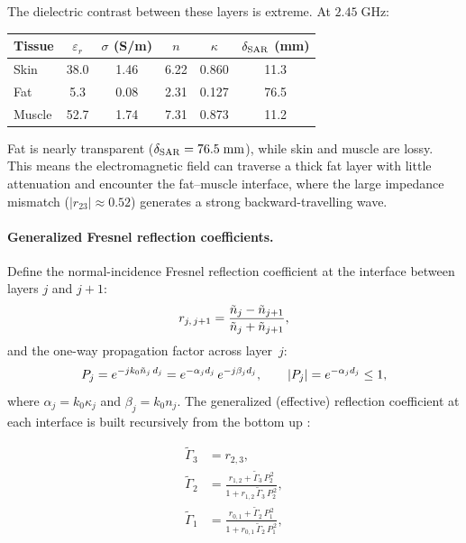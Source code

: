 \noindent
The dielectric contrast between these layers is extreme.  At
$2.45\;\mathrm{GHz}$:

\begin{center}
\begin{tabular}{@{}l c c c c c@{}}
\toprule
Tissue & $\varepsilon_r$ & $\sigma$ (S/m) & $n$ & $\kappa$ &
  $\delta_{\mathrm{SAR}}$ (mm) \\
\midrule
Skin   & 38.0 & 1.46 & 6.22 & 0.860 & 11.3 \\
Fat    &  5.3 & 0.08 & 2.31 & 0.127 & 76.5 \\
Muscle & 52.7 & 1.74 & 7.31 & 0.873 & 11.2 \\
\bottomrule
\end{tabular}
\end{center}

\noindent
Fat is nearly transparent ($\delta_{\mathrm{SAR}} = 76.5\;\mathrm{mm}$), while
skin and muscle are lossy.  This means the electromagnetic field can
traverse a thick fat layer with little attenuation and encounter the
fat--muscle interface, where the large impedance mismatch ($|r_{23}|
\approx 0.52$) generates a strong backward-travelling wave.

\paragraph{Generalized Fresnel reflection coefficients.}
Define the normal-incidence Fresnel reflection coefficient at the
interface between layers $j$ and $j+1$:
\begin{equation}\label{eq:rjj1}
  r_{j,\,j+1}
  = \frac{\tilde{n}_j - \tilde{n}_{j+1}}{\tilde{n}_j + \tilde{n}_{j+1}},
\end{equation}
and the one-way propagation factor across layer~$j$:
\begin{equation}\label{eq:Pj}
  P_j = e^{-jk_0\tilde{n}_j\,d_j}
  = e^{-\alpha_j d_j}\,e^{-j\beta_j d_j},
  \qquad
  |P_j| = e^{-\alpha_j d_j} \leq 1,
\end{equation}
where $\alpha_j = k_0\kappa_j$ and $\beta_j = k_0 n_j$.
The generalized (effective) reflection coefficient at each interface is
built recursively from the bottom up \cite{Chew1995}:

\begin{align}
  \widetilde{\Gamma}_3
    &= r_{2,3},
    \label{eq:Gamma3} \\[4pt]
  \widetilde{\Gamma}_2
    &= \frac{r_{1,2} + \widetilde{\Gamma}_3\,P_2^{\,2}}
            {1 + r_{1,2}\,\widetilde{\Gamma}_3\,P_2^{\,2}},
    \label{eq:Gamma2} \\[4pt]
  \widetilde{\Gamma}_1
    &= \frac{r_{0,1} + \widetilde{\Gamma}_2\,P_1^{\,2}}
            {1 + r_{0,1}\,\widetilde{\Gamma}_2\,P_1^{\,2}},
    \label{eq:Gamma1}
\end{align}

